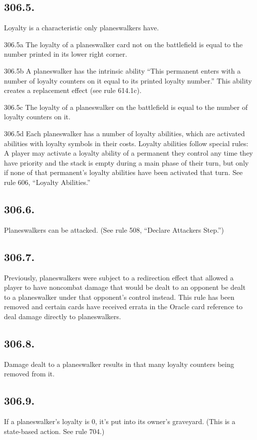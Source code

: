 \subsection*{306.5.}
Loyalty is a characteristic only planeswalkers have.

306.5a The loyalty of a planeswalker card not on the battlefield is equal to the number printed in its lower right corner.

306.5b A planeswalker has the intrinsic ability “This permanent enters with a number of loyalty counters on it equal to its printed loyalty number.” This ability creates a replacement effect (see rule 614.1c).

306.5c The loyalty of a planeswalker on the battlefield is equal to the number of loyalty counters on it.

306.5d Each planeswalker has a number of loyalty abilities, which are activated abilities with loyalty symbols in their costs. Loyalty abilities follow special rules: A player may activate a loyalty ability of a permanent they control any time they have priority and the stack is empty during a main phase of their turn, but only if none of that permanent’s loyalty abilities have been activated that turn. See rule 606, “Loyalty Abilities.”

\subsection*{306.6.}
Planeswalkers can be attacked. (See rule 508, “Declare Attackers Step.”)

\subsection*{306.7.}
Previously, planeswalkers were subject to a redirection effect that allowed a player to have noncombat damage that would be dealt to an opponent be dealt to a planeswalker under that opponent’s control instead. This rule has been removed and certain cards have received errata in the Oracle card reference to deal damage directly to planeswalkers.

\subsection*{306.8.}
Damage dealt to a planeswalker results in that many loyalty counters being removed from it.

\subsection*{306.9.}
If a planeswalker’s loyalty is 0, it’s put into its owner’s graveyard. (This is a state-based action. See rule 704.)

